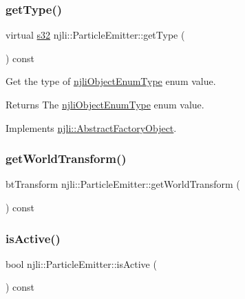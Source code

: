 \subsubsection{\texorpdfstring{get\+Type()}{getType()}}
{\footnotesize\ttfamily virtual \mbox{\hyperlink{_util_8h_aa62c75d314a0d1f37f79c4b73b2292e2}{s32}} njli\+::\+Particle\+Emitter\+::get\+Type (\begin{DoxyParamCaption}{ }\end{DoxyParamCaption}) const\hspace{0.3cm}{\ttfamily [virtual]}}

Get the type of \mbox{\hyperlink{namespacenjli_a6d56d4fbaf89fcf3e3d32839df05b444}{njli\+Object\+Enum\+Type}} enum value.

\begin{DoxyReturn}{Returns}
The \mbox{\hyperlink{namespacenjli_a6d56d4fbaf89fcf3e3d32839df05b444}{njli\+Object\+Enum\+Type}} enum value. 
\end{DoxyReturn}


Implements \mbox{\hyperlink{classnjli_1_1_abstract_factory_object_a207c86146d40d0794708ae7f2d4e60a7}{njli\+::\+Abstract\+Factory\+Object}}.

\mbox{\label{classnjli_1_1_particle_emitter_a7376b63782edf2010d75abf77ef087ff}} 
\subsubsection{\texorpdfstring{get\+World\+Transform()}{getWorldTransform()}}
{\footnotesize\ttfamily bt\+Transform njli\+::\+Particle\+Emitter\+::get\+World\+Transform (\begin{DoxyParamCaption}{ }\end{DoxyParamCaption}) const}

\mbox{\label{classnjli_1_1_particle_emitter_a1f1b6f8ad353f240fc89e9d4febbcdae}} 
\subsubsection{\texorpdfstring{is\+Active()}{isActive()}}
{\footnotesize\ttfamily bool njli\+::\+Particle\+Emitter\+::is\+Active (\begin{DoxyParamCaption}{ }\end{DoxyParamCaption}) const}

